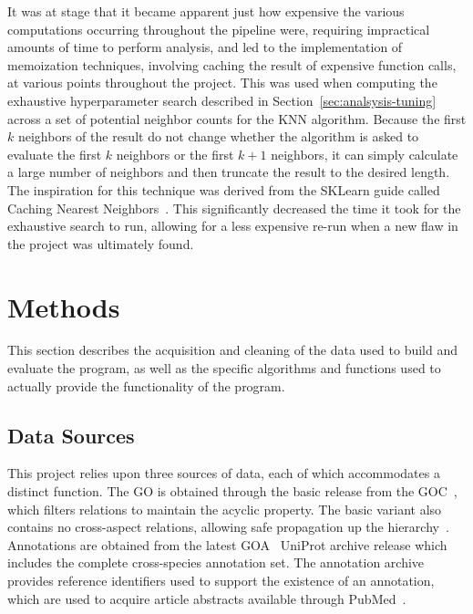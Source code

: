 \documentclass[11pt]{article}
\theoremstyle{plain}
\theoremstyle{definition}
\begin{document}
It was at stage that it became apparent just how expensive the various computations occurring throughout the pipeline were, requiring impractical amounts of time to perform analysis, and led to the implementation of memoization techniques, involving caching the result of expensive function calls, at various points throughout the project. This was used when computing the exhaustive hyperparameter search described in Section~\ref{sec:analsysis-tuning} across a set of potential neighbor counts for the KNN algorithm. Because the first $k$ neighbors of the result do not change whether the algorithm is asked to evaluate the first $k$ neighbors or the first $k+1$ neighbors, it can simply calculate a large number of neighbors and then truncate the result to the desired length. The inspiration for this technique was derived from the SKLearn guide called Caching Nearest Neighbors~\cite{sklearn/2026/cache}. This significantly decreased the time it took for the exhaustive search to run, allowing for a less expensive re-run when a new flaw in the project was ultimately found.

\section{Methods}\label{sec:methods}

This section describes the acquisition and cleaning of the data used to build and evaluate the program, as well as the specific algorithms and functions used to actually provide the functionality of the program.

\subsection{Data Sources}\label{sec:methods-source}

This project relies upon three sources of data, each of which accommodates a distinct function. The GO is obtained through the basic release from the GOC~\cite{consortium/2025/gene},  which filters relations to maintain the acyclic property. The basic variant also contains no cross-aspect relations, allowing safe propagation up the hierarchy~\cite{go/2026/download}. Annotations are obtained from the latest GOA~\cite{huntley/2014/database, barrell/2009/database} UniProt archive release which includes the complete cross-species annotation set. The annotation archive provides reference identifiers used to support the existence of an annotation, which are used to acquire article abstracts available through PubMed~\cite{sayers/2024/database}.
\end{document}
